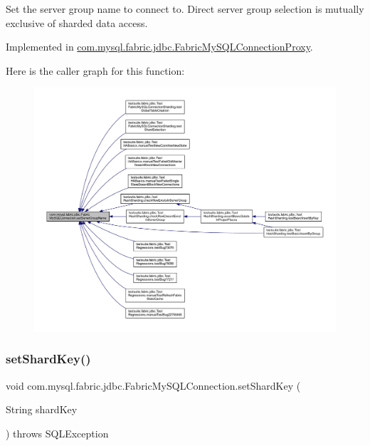 Set the server group name to connect to. Direct server group selection is mutually exclusive of sharded data access. 

Implemented in \mbox{\hyperlink{classcom_1_1mysql_1_1fabric_1_1jdbc_1_1_fabric_my_s_q_l_connection_proxy_a288c67fc74fabc15a7a108d28ff6c52b}{com.\+mysql.\+fabric.\+jdbc.\+Fabric\+My\+S\+Q\+L\+Connection\+Proxy}}.

Here is the caller graph for this function\+:\nopagebreak
\begin{figure}[H]
\begin{center}
\leavevmode
\includegraphics[width=350pt]{interfacecom_1_1mysql_1_1fabric_1_1jdbc_1_1_fabric_my_s_q_l_connection_a934f2eca033d68725f572ceab4585efc_icgraph}
\end{center}
\end{figure}
\mbox{\label{interfacecom_1_1mysql_1_1fabric_1_1jdbc_1_1_fabric_my_s_q_l_connection_ab3be2f1efeb29e95c43ef316dd8ce0bf}} 
\subsubsection{\texorpdfstring{set\+Shard\+Key()}{setShardKey()}}
{\footnotesize\ttfamily void com.\+mysql.\+fabric.\+jdbc.\+Fabric\+My\+S\+Q\+L\+Connection.\+set\+Shard\+Key (\begin{DoxyParamCaption}\item[{String}]{shard\+Key }\end{DoxyParamCaption}) throws S\+Q\+L\+Exception}

